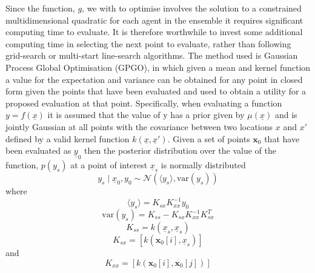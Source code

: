 \documentclass[a4paper, 10 pt, conference]{ieeeconf}  %
\begin{document}
Since the function, $g$, we with to optimise involves the solution to a constrained multidimensional quadratic for each agent in the ensemble it requires significant computing time to evaluate. It is therefore worthwhile to invest some additional computing time in selecting the next point to evaluate, rather than following grid-search or multi-start line-search algorithms. The method used is Gaussian Process Global Optimisation (GPGO)\cite{garnettgaussian}, in which given a mean and kernel function a value for the expectation and variance can be obtained for any point in closed form given the points that have been evaluated and used to obtain a utility for a proposed evaluation at that point.
Specifically, when evaluating a function $y=f(\underline{x})$  it is assumed that the value of y has a prior given by $\mu (\underline{x})$ and is jointly Gaussian at all points with the covariance between two locations $x$ and $x'$ defined by a valid kernel function $k(\underline{x},\underline{x}')$. Given a set of points $\mathbf{x}_{0}$ that have been evaluated as $\underline{y}_{0}$ then the posterior distribution over the value of the function, $p(y_{s})$ at a point of interest $\underline{x}_s$ is normally distributed
\begin{equation}
 y_{s}\mid \underline{x}_{0},y_{0}\sim\mathcal{N}\left( \langle y_{s}\rangle ,\mathrm{var}(y_{s})\right)
\end{equation}
where
\begin{equation}
\langle y_{s}\rangle 	=K_{sx}K_{xx}^{-1}y_{0}
\end{equation}
\begin{equation}
\mathrm{var}\left(y_{s}\right)	=K_{ss}-K_{sx} K_{xx}^{-1} K_{sx}^{T}
\end{equation}
\begin{equation}
K_{ss}	= k(\underline{x}_s,\underline{x}_s)
\end{equation}
\begin{equation}
K_{sx}	=[k\left(\mathbf{x}_{0}[i],\underline{x}_s\right)]
\end{equation}
and
\begin{equation}
K_{xx}	=[k\left(\mathbf{x}_{0}[i],\mathbf{x}_{0}[j]\right)]
\end{equation}
\end{document}
